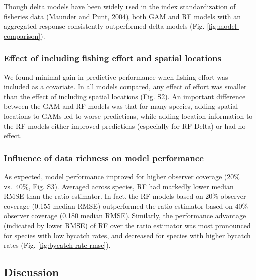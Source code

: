 \documentclass[]{article}
\begin{document}
Though delta models have been widely used in the index standardization
of fisheries data (Maunder and Punt, 2004), both GAM and RF models with
an aggregated response consistently outperformed delta models (Fig.
\ref{fig:model-comparison}).

\subsubsection{Effect of including fishing effort and spatial
locations}\label{effect-of-including-fishing-effort-and-spatial-locations}

We found minimal gain in predictive performance when fishing effort was
included as a covariate. In all models compared, any effect of effort
was smaller than the effect of including spatial locations (Fig. S2). An
important difference between the GAM and RF models was that for many
species, adding spatial locations to GAMs led to worse predictions,
while adding location information to the RF models either improved
predictions (especially for RF-Delta) or had no effect.

\subsubsection{Influence of data richness on model
performance}\label{influence-of-data-richness-on-model-performance}

As expected, model performance improved for higher observer coverage
(20\% vs.~40\%, Fig. S3). Averaged across species, RF had markedly lower
median RMSE than the ratio estimator. In fact, the RF models based on
20\% observer coverage (0.155 median RMSE) outperformed the ratio
estimator based on 40\% observer coverage (0.180 median RMSE).
Similarly, the performance advantage (indicated by lower RMSE) of RF
over the ratio estimator was most pronounced for species with low
bycatch rates, and decreased for species with higher bycatch rates (Fig.
\ref{fig:bycatch-rate-rmse}).

\subsection{Discussion}\label{discussion}
\end{document}
